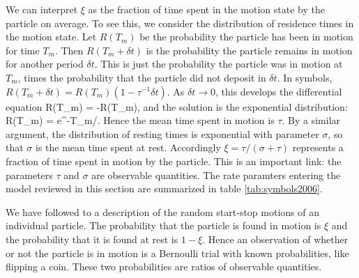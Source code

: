 We can interpret $\xi$ as the fraction of time spent in the motion state by the particle on average. 
To see this, we consider the distribution of residence times in the motion state. 
Let $R(T_m)$ be the probability the particle has been in motion for time $T_m$.
Then $R(T_m+\delta t)$ is the probability the particle remains in motion for another period $\delta t$.
This is just the probability the particle was in motion at $T_m$, times the probability that the particle did not deposit in $\delta t$. 
In symbols, $ R(T_m + \delta t) = R(T_m)(1-\tau^{-1}\delta t). $ 
As $\delta t \rightarrow 0$, this develops the differential equation 
\be {}R(T_m) = -R(T_m),\ee
and the solution is the exponential distribution: 
\be R(T_m) = \tau e^{-T_m/\tau}.\ee
Hence the mean time spent in motion is $\tau$. 
By a similar argument, the distribution of resting times is exponential with parameter $\sigma$, so that $\sigma$ is the mean time spent at rest. 
Accordingly $\xi = \tau/(\sigma+\tau)$ represents a fraction of time spent in motion by the particle. 
This is an important link: the parameters $\tau$ and $\sigma$ are observable quantities.
The rate paramters entering the \citet{Ancey2006} model reviewed in this section are summarized in table \ref{tab:symbols2006}. 

We have followed \citet{Ancey2006} to a description of the random start-stop motions of an individual particle. 
The probability that the particle is found in motion is $\xi$ and the probability that it is found at rest is $1-\xi$. 
Hence an observation of whether or not the particle is in motion is a Bernoulli trial with known probabilities, like flipping a coin.
These two probabilities are ratios of observable quantities.  


